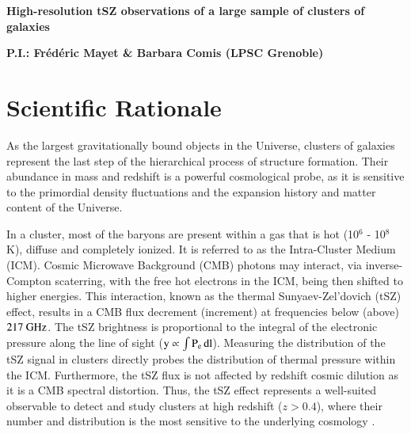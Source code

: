 \documentclass[11pt,a4paper,twoside,graphicx,color]{article}
\begin{document}
%
%
\begin{center}{\huge \bf
High-resolution tSZ observations of a large sample of clusters of galaxies 
}\end{center}
%
\centerline{\bf P.I.: Fr\'ed\'eric Mayet \& Barbara Comis (LPSC Grenoble)}


\section{Scientific Rationale}
As the largest gravitationally bound objects in the Universe,
clusters of galaxies represent the last step of the hierarchical process of structure formation.
Their abundance in mass and redshift is a powerful cosmological probe, as it is sensitive to the primordial
density fluctuations and the expansion history and matter content of the Universe.

In a cluster, most of the baryons are present within a gas that is hot
(10$^6$ - 10$^8$ K), diffuse and completely ionized. It is referred to
as the Intra-Cluster Medium (ICM). Cosmic Microwave Background (CMB)
photons may interact, via inverse-Compton scaterring, with the free hot
electrons in the ICM, being then shifted to higher energies.
This interaction, known as the thermal Sunyaev-Zel'dovich (tSZ)
effect, results in a CMB flux decrement (increment) at frequencies
below (above) $217~\rm{GHz}$.
The tSZ brightness   is proportional to
the integral of the electronic pressure   along the line
of sight ($\rm{y} \propto \int P_{e}\, dl$). Measuring the distribution of
the tSZ signal in clusters directly probes the distribution of thermal
pressure within the ICM. Furthermore, the tSZ flux is not affected by redshift cosmic dilution
as it is a CMB spectral distortion. Thus, the tSZ effect represents
a   well-suited observable to detect and study
clusters at high redshift ($z>0.4$), where their number and
distribution is the most sensitive to the underlying cosmology \cite{Carlstrom2002}.
\end{document}
